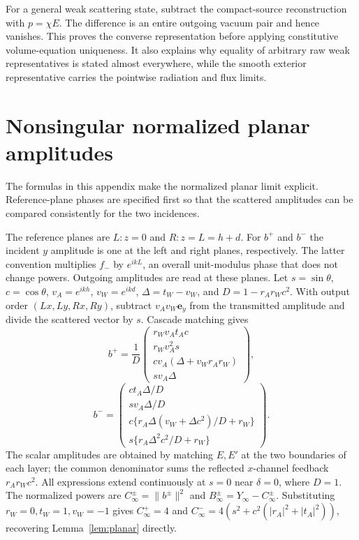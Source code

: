 \documentclass[11pt]{article}
\newcommand{\ey}{\mathbf e_y}
\newcommand{\norm}[1]{\lVert #1\rVert}
\newcommand{\abs}[1]{\lvert #1\rvert}
\begin{document}
For a general weak scattering state, subtract the compact-source reconstruction with $p=\chi E$. The difference is an entire outgoing vacuum pair and hence vanishes. This proves the converse representation before applying constitutive volume-equation uniqueness. It also explains why equality of arbitrary raw weak representatives is stated almost everywhere, while the smooth exterior representative carries the pointwise radiation and flux limits.

\section{Nonsingular normalized planar amplitudes}\label{app:amplitudes}
The formulas in this appendix make the normalized planar limit explicit. Reference-plane phases are specified first so that the scattered amplitudes can be compared consistently for the two incidences.

The reference planes are $L:z=0$ and $R:z=L=h+d$. For $b^+$ and $b^-$ the incident $y$ amplitude is one at the left and right planes, respectively. The latter convention multiplies $f_-$ by $e^{ikL}$, an overall unit-modulus phase that does not change powers. Outgoing amplitudes are read at these planes. Let $s=\sin\theta$, $c=\cos\theta$, $v_A=e^{ikh}$, $v_W=e^{ikd}$, $\Delta=t_W-v_W$, and $D=1-r_Ar_Wc^2$. With output order $(Lx,Ly,Rx,Ry)$, subtract $v_Av_W\ey$ from the transmitted amplitude and divide the scattered vector by $s$. Cascade matching gives
\begin{equation}\label{eq:amplitudes-plus}
 b^+=\frac1D\begin{pmatrix}
 r_Wv_At_Ac\\r_Wv_A^2s\\cv_A(\Delta+v_Wr_Ar_W)\\sv_A\Delta
 \end{pmatrix},
\end{equation}
\begin{equation}\label{eq:amplitudes-minus}
 b^-=\begin{pmatrix}
 ct_A\Delta/D\\sv_A\Delta/D\\
 c\{r_A\Delta(v_W+\Delta c^2)/D+r_W\}\\
 s\{r_A\Delta^2c^2/D+r_W\}
 \end{pmatrix}.
\end{equation}
The scalar amplitudes are obtained by matching $E,E'$ at the two boundaries of each layer; the common denominator sums the reflected $x$-channel feedback $r_Ar_Wc^2$. All expressions extend continuously at $s=0$ near $\delta=0$, where $D=1$. The normalized powers are $C_\infty^\pm=\norm{b^\pm}^2$ and $B_\infty^\pm=Y_\infty-C_\infty^\pm$. Substituting $r_W=0,t_W=1,v_W=-1$ gives $C_\infty^+=4$ and $C_\infty^-=4(s^2+c^2(\abs{r_A}^2+\abs{t_A}^2))$, recovering Lemma~\ref{lem:planar} directly.
\end{document}
